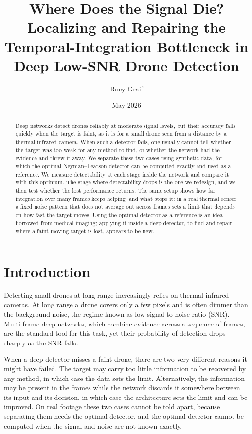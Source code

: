 \documentclass[11pt]{article}
\title{Where Does the Signal Die?\\
\large Localizing and Repairing the Temporal-Integration Bottleneck in
Deep Low-SNR Drone Detection}
\author{Roey Graif}
\date{May 2026}
\begin{document}
\maketitle

\begin{abstract}
\noindent
Deep networks detect drones reliably at moderate signal levels, but their
accuracy falls quickly when the target is faint, as it is for a small drone seen
from a distance by a thermal infrared camera. When such a detector fails, one
usually cannot tell whether the target was too weak for any method to find, or
whether the network had the evidence and threw it away. We separate these two
cases using synthetic data, for which the optimal Neyman--Pearson detector can be
computed exactly and used as a reference. We measure detectability at each stage
inside the network and compare it with this optimum. The stage where
detectability drops is the one we redesign, and we then test whether the lost
performance returns. The same setup shows how far integration over many frames
keeps helping, and what stops it: in a real thermal sensor a fixed noise pattern
that does not average out across frames sets a limit that depends on how fast the
target moves. Using the optimal detector as a reference is an idea borrowed from
medical imaging; applying it inside a deep detector, to find and repair where a
faint moving target is lost, appears to be new.
\end{abstract}

\section{Introduction}

Detecting small drones at long range increasingly relies on thermal infrared
cameras. At long range a drone covers only a few pixels and is often dimmer than
the background noise, the regime known as low signal-to-noise ratio (SNR).
Multi-frame deep networks, which combine evidence across a sequence of frames,
are the standard tool for this task, yet their probability of detection drops
sharply as the SNR falls.

When a deep detector misses a faint drone, there are two very different reasons
it might have failed. The target may carry too little information to be recovered
by any method, in which case the data sets the limit. Alternatively, the
information may be present in the frames while the network discards it somewhere
between its input and its decision, in which case the architecture sets the limit
and can be improved. On real footage these two cases cannot be told apart,
because separating them needs the optimal detector, and the optimal detector
cannot be computed when the signal and noise are not known exactly.
\end{document}
